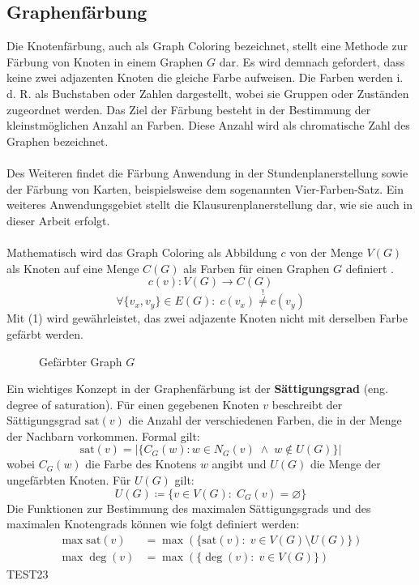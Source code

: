 \subsection{Graphenfärbung}
Die Knotenfärbung, auch als Graph Coloring bezeichnet, stellt eine Methode zur Färbung von Knoten in einem Graphen $G$ dar. 
Es wird demnach gefordert, dass keine zwei adjazenten Knoten die gleiche Farbe aufweisen.
Die Farben werden i. d. R. als Buchstaben oder Zahlen dargestellt, wobei sie Gruppen oder Zuständen zugeordnet werden.
Das Ziel der Färbung besteht in der Bestimmung der kleinstmöglichen Anzahl an Farben.
Diese Anzahl wird als chromatische Zahl des Graphen bezeichnet.\\\\
Des Weiteren findet die Färbung Anwendung in der Stundenplanerstellung sowie der Färbung von Karten, beispielsweise dem sogenannten Vier-Farben-Satz.
Ein weiteres Anwendungsgebiet stellt die Klausurenplanerstellung dar, wie sie auch in dieser Arbeit erfolgt.\\\\
\newpage
\noindent Mathematisch wird das Graph Coloring als Abbildung $c$ von der Menge $V(G)$ als Knoten auf eine Menge $C(G)$ als Farben für einen Graphen $G$ definiert \parencite[121]{Diestel2017-bj}.
\begin{equation*}
c(v): V(G) \rightarrow C(G)
\end{equation*}
\begin{equation}
\forall \{v_x,v_y\} \in E(G) \colon \; c(v_x) \overset{!}{\neq} c(v_y)
\end{equation}
Mit (1) wird gewährleistet, das zwei adjazente Knoten nicht mit derselben Farbe gefärbt werden.
\vspace{-2.25cm}
\begin{figure}[H]
    \centering
    
    \vspace{-2cm}
    \caption{Gefärbter Graph $G$}
\end{figure}
\noindent Ein wichtiges Konzept in der Graphenfärbung ist der \textbf{Sättigungsgrad} (eng. degree of saturation). 
Für einen gegebenen Knoten $v$ beschreibt der Sättigungsgrad $\text{sat}(v)$ die Anzahl der verschiedenen Farben, die in der Menge der Nachbarn vorkommen. Formal gilt: 
\parencite[39]{lewis2021guide}
\begin{equation*}
    \text{sat}(v)=|\{C_G(w)\colon w \in N_G(v) \; \wedge \; w \notin U(G)\}|
\end{equation*}
wobei $C_G(w)$ die Farbe des Knotens $w$ angibt und $U(G)$ die Menge der ungefärbten Knoten. Für $U(G)$ gilt:
\begin{equation*}
    U(G)\coloneqq \{v \in V(G) \colon \;C_G(v) = \varnothing\}
\end{equation*}
Die Funktionen zur Bestimmung des maximalen Sättigungsgrads und des maximalen Knotengrads können wie folgt definiert werden:
\begin{align*}
    \max \text{sat}(v) &= \max(\{\text{sat}(v)\colon \; v \in V(G) \setminus U(G)\})\\
    \max \deg(v) &= \max(\{\deg(v) \colon \; v \in V(G)\})
\end{align*}
TEST23